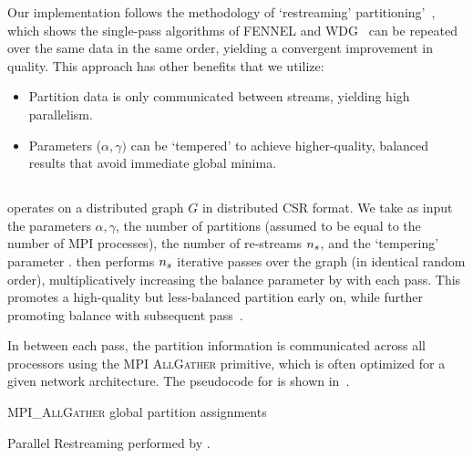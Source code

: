 Our implementation follows the methodology of `restreaming' partitioning'~\cite{nishimura2013restream}, which shows the single-pass algorithms of FENNEL and WDG~\cite{tsourakakis2012fennel,Stanton:2012:SGP:2339530.2339722} can be repeated over the same data in the same order, yielding a convergent improvement in quality. This approach has other benefits that we utilize:

\begin{itemize}
\item Partition data is only communicated between streams, yielding high parallelism.
\item Parameters ($\alpha, \gamma)$ can be `tempered' to achieve higher-quality, balanced results that avoid immediate global minima.
\end{itemize}

\subsection{\ourmethod}
\ourmethod operates on a distributed graph $G$ in distributed CSR format. We take as input the parameters $\alpha, \gamma$, the number of partitions \numprocsparm (assumed to be equal to the number of MPI processes), the number of re-streams $n_s$, and the `tempering' parameter \expparm. \ourmethod then performs $n_s$ iterative passes over the graph (in identical random order), multiplicatively increasing the balance parameter by \expparm with each pass. This promotes a high-quality but less-balanced partition early on, while further promoting balance with subsequent pass~\cite{nishimura2013restream}. 

In between each pass, the partition information is communicated across all processors using the MPI \textsc{AllGather} primitive, which is often optimized for a given network architecture. The pseudocode for \ourmethod is shown in~.


\begin{algorithm}
 {
	\textsc{MPI\_AllGather} global partition assignments\;
}
 \caption{Parallel Restreaming performed by \ourmethod.}
 \label{alg:grasp}
\end{algorithm}

